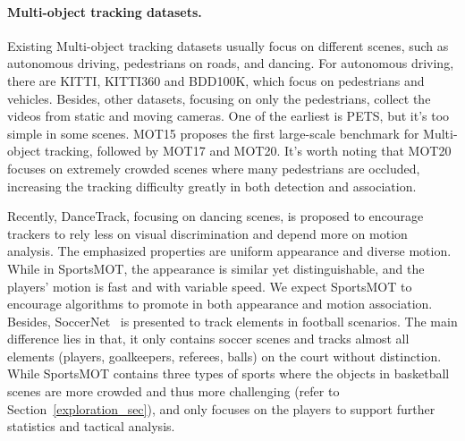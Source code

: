 \documentclass[10pt,twocolumn,letterpaper]{article}
\begin{document}
\paragraph{Multi-object tracking datasets.}
Existing Multi-object tracking datasets usually focus on different scenes, such as autonomous driving, pedestrians on roads, and dancing. For autonomous driving, there are KITTI\cite{geiger2012we}, KITTI360\cite{liao2022kitti} and BDD100K\cite{yu2020bdd100k}, which focus on pedestrians and vehicles. Besides, other datasets, focusing on only the pedestrians, collect the videos from static and moving cameras. One of the earliest is PETS\cite{ferryman2009pets2009}, but it's too simple in some scenes. MOT15\cite{leal2015motchallenge} proposes the first large-scale benchmark for Multi-object tracking, followed by MOT17\cite{milan2016mot16} and MOT20\cite{dendorfer2020mot20}. It's worth noting that MOT20 focuses on extremely crowded scenes where many pedestrians are occluded, increasing the tracking difficulty greatly in both detection and association.
\begin{table}[pt]
\centering
{}
\vspace{-3mm}
\caption{Comparison of statistics between existing human MOT datasets and our SportsMOT.}
\vspace{-6mm}
\label{table_statistic}
\end{table}
Recently, DanceTrack\cite{sun2022dancetrack}, focusing on dancing scenes, is proposed to encourage trackers to rely less on visual discrimination and depend more on motion analysis. The emphasized properties are uniform appearance and diverse motion. While in SportsMOT, the appearance is similar yet distinguishable, and the players' motion is fast and with variable speed. We expect SportsMOT to encourage algorithms to promote in both appearance and motion association. Besides, SoccerNet~\cite{soccernet} is presented to track elements in football scenarios. The main difference lies in that, it only contains soccer scenes and tracks almost all elements (players, goalkeepers, referees, balls) on the court without distinction. While SportsMOT contains three types of sports where the objects in basketball scenes are more crowded and thus more challenging (refer to Section~\ref{exploration_sec}), and only focuses on the players to support further statistics and tactical analysis. 
\end{document}
